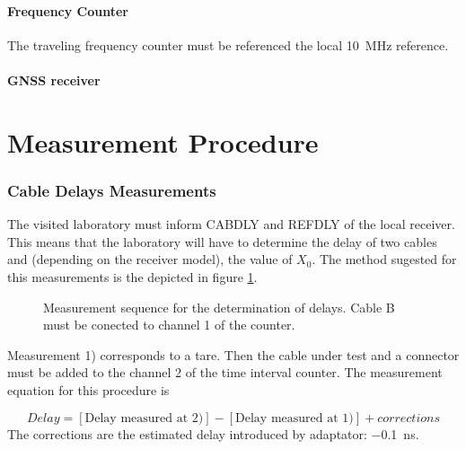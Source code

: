 \documentclass[11pt]{article}
\begin{document}
\subsection{Frequency Counter}
The traveling frequency counter must be referenced the local \SI{10}{\mega\hertz} reference.



\subsection{GNSS receiver}






\part{Measurement Procedure }

\section{Cable Delays Measurements}

The visited laboratory must inform CABDLY and REFDLY of the local receiver. This means that the laboratory will have to determine the delay of two cables and (depending on the receiver model), the value of $X_0$.
The method sugested for this measurements is the depicted in figure \ref{fig:DUTdelaymeasurement}.


\begin{figure}[ht]
\begin{center}

\caption{Measurement sequence for the determination of delays. Cable B must be conected to channel 1 of the counter.} \label{fig:DUTdelaymeasurement}
\end{center}
\end{figure}

Measurement 1) corresponds to a tare. Then the cable under test and a connector must be added to the channel 2 of the time interval counter. The measurement equation for this procedure is 

\begin{equation}
Delay = [\text{Delay measured at 2)} ] - [\text{Delay measured at 1)} ] + corrections
\end{equation}
The corrections are the estimated delay introduced by adaptator: \SI{-0.1}{\nano\second}. 
\end{document}
